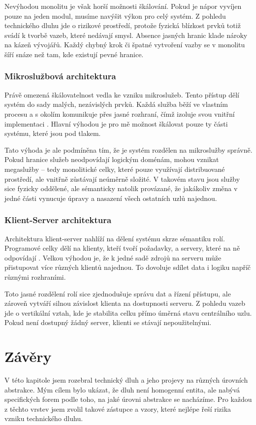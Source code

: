 \documentclass[FM,DP,fonts]{tulthesis}
\begin{document}
Nevýhodou monolitu je však horší možnosti škálování. Pokud je nápor vyvíjen pouze na jeden modul, musíme navýšit výkon pro celý systém. Z pohledu technického dluhu jde o rizikové prostředí, protože fyzická blízkost prvků totiž svádí k tvorbě vazeb, které nedávají smysl. Absence jasných hranic klade nároky na kázeň vývojářů. Každý chybný krok či špatné vytvoření vazby se v monolitu šíří snáze než tam, kde existují pevné hranice.

\subsubsection{Mikroslužbová architektura}
Právě omezená škálovatelnost vedla ke vzniku mikroslužeb. Tento přístup dělí systém do sady malých, nezávislých prvků. Každá služba běží ve vlastním procesu a s okolím komunikuje přes jasné rozhraní, čímž izoluje svou vnitřní implementaci \parencite{fowler-microservices}. Hlavní výhodou je pro mě možnost škálovat pouze ty části systému, které jsou pod tlakem.

Tato výhoda je ale podmíněna tím, že je systém rozdělen na mikroslužby správně. Pokud hranice služeb neodpovídají logickým doménám, mohou vznikat megaslužby – tedy monolitické celky, které pouze využívají distribuované prostředí, ale vnitřně zůstávají neúměrně složité. V takovém stavu jsou služby sice fyzicky oddělené, ale sémanticky natolik provázané, že jakákoliv změna v jedné části vynucuje úpravy a nasazení všech ostatních uzlů najednou.

\subsubsection{Klient-Server architektura}
Architektura klient-server nahlíží na dělení systému skrze sémantiku rolí. Programové celky dělí na klienty, kteří tvoří požadavky, a servery, které na ně odpovídají \parencite{oluwatosin2014client}. Velkou výhodou je, že k jedné sadě zdrojů na serveru může přistupovat více různých klientů najednou. To dovoluje sdílet data i logiku napříč různými rozhraními.

Toto jasné rozdělení rolí sice zjednodušuje správu dat a řízení přístupu, ale zároveň vytváří silnou závislost klienta na dostupnosti serveru. Z pohledu vazeb jde o vertikální vztah, kde je stabilita celku přímo úměrná stavu centrálního uzlu. Pokud není dostupný žádný server, klienti se stávají nepoužitelnými.

\section{Závěry}
V této kapitole jsem rozebral technický dluh a jeho projevy na různých úrovních abstrakce. Mým cílem bylo ukázat, že dluh není homogenní entita, ale nabývá specifických forem podle toho, na jaké úrovni abstrakce se nacházíme. Pro každou z těchto vrstev jsem zvolil takové zástupce a vzory, které nejlépe řeší rizika vzniku technického dluhu.
\end{document}
